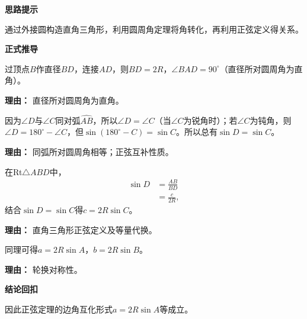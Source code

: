 \begin{proofbox}
	\textbf{\textcolor{CProof}{思路提示}}

	通过外接圆构造直角三角形，利用圆周角定理将角转化，再利用正弦定义得关系。

	\medskip
	\textbf{\textcolor{CProof}{正式推导}}
	\begin{description}[style=nextline, leftmargin=2.8em, labelsep=0.5em, itemsep=0.55em]
		\item[\textbf{步骤一（构造直径）：}] 过顶点$B$作直径$BD$，连接$AD$，则$BD=2R$，$\angle BAD=90^\circ$（直径所对圆周角为直角）。
			\par\textbf{理由：} 直径所对圆周角为直角。
		\item[\textbf{步骤二（转化角）：}] 因为$\angle D$与$\angle C$同对弧$\widehat{AB}$，所以$\angle D = \angle C$（当$\angle C$为锐角时）；若$\angle C$为钝角，则$\angle D = 180^\circ - \angle C$，但$\sin(180^\circ-C)=\sin C$。所以总有$\sin D = \sin C$。
			\par\textbf{理由：} 同弧所对圆周角相等；正弦互补性质。
		\item[\textbf{步骤三（建立等式）：}] 在Rt$\triangle ABD$中，
			\[
				\begin{aligned}
					\sin D &= \frac{AB}{BD} \\
					&= \frac{c}{2R},
			\end{aligned}
			\]
			结合$\sin D = \sin C$得$c = 2R\sin C$。
			\par\textbf{理由：} 直角三角形正弦定义及等量代换。
		\item[\textbf{步骤四（推广到其他边）：}] 同理可得$a = 2R\sin A$，$b = 2R\sin B$。
			\par\textbf{理由：} 轮换对称性。
	\end{description}

	\medskip
	\textbf{\textcolor{CProof}{结论回扣}}

	因此正弦定理的边角互化形式$a=2R\sin A$等成立。
\end{proofbox}
